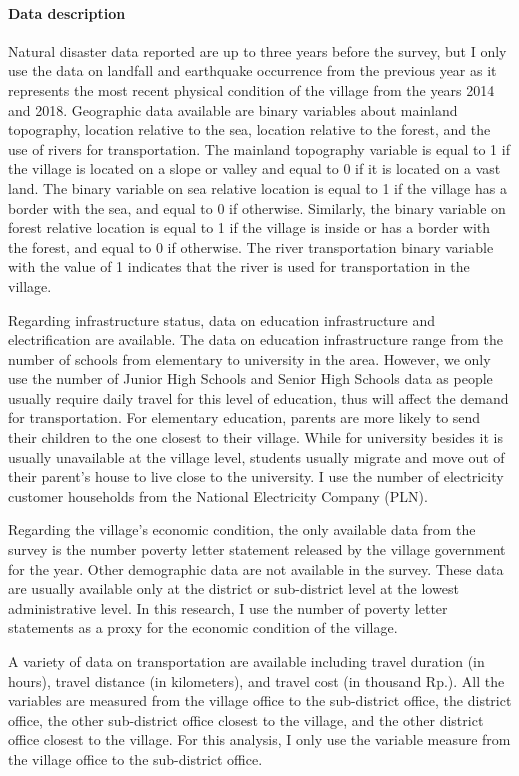 \documentclass[letterpaper,12pt,leqno]{article}
\begin{document}
\paragraph{Data description} Natural disaster data reported are up to three years before the survey, but I only use the data on landfall and earthquake occurrence from the previous year as it represents the most recent physical condition of the village from the years 2014 and 2018. Geographic data available are binary variables about mainland topography, location relative to the sea, location relative to the forest, and the use of rivers for transportation. The mainland topography variable is equal to 1 if the village is located on a slope or valley and equal to 0 if it is located on a vast land. The binary variable on sea relative location is equal to 1 if the village has a border with the sea, and equal to 0 if otherwise. Similarly, the binary variable on forest relative location is equal to 1 if the village is inside or has a border with the forest, and equal to 0 if otherwise. The river transportation binary variable with the value of 1 indicates that the river is used for transportation in the village.

Regarding infrastructure status, data on education infrastructure and electrification are available. The data on education infrastructure range from the number of schools from elementary to university in the area. However, we only use the number of Junior High Schools and Senior High Schools data as people usually require daily travel for this level of education, thus will affect the demand for transportation. For elementary education, parents are more likely to send their children to the one closest to their village. While for university besides it is usually unavailable at the village level, students usually migrate and move out of their parent's house to live close to the university. I use the number of electricity customer households from the National Electricity Company (PLN).

Regarding the village's economic condition, the only available data from the survey is the number poverty letter statement released by the village government for the year. Other demographic data are not available in the survey. These data are usually available only at the district or sub-district level at the lowest administrative level. In this research, I use the number of poverty letter statements as a proxy for the economic condition of the village.

A variety of data on transportation are available including travel duration (in hours), travel distance (in kilometers), and travel cost (in thousand Rp.). All the variables are measured from the village office to the sub-district office, the district office, the other sub-district office closest to the village, and the other district office closest to the village. For this analysis, I only use the variable measure from the village office to the sub-district office.
\end{document}
